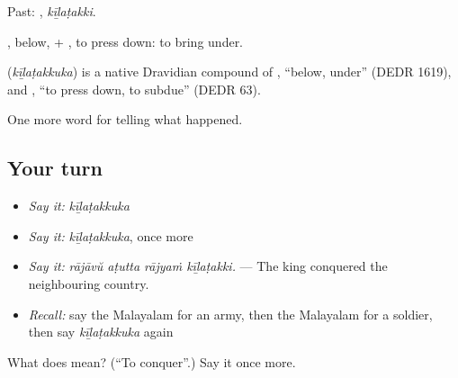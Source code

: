 Past: , \emph{kīḻaṭakki}.

, below, + , to press down: to bring under.

\begin{cousinweb}
\textbf{} (\emph{kīḻaṭakkuka}) is a native Dravidian compound of , \textquotedblleft{}below, under\textquotedblright{} (DEDR 1619), and , \textquotedblleft{}to press down, to subdue\textquotedblright{} (DEDR 63).
\end{cousinweb}

\begin{grammarlens}[title={What you've built}]
One more word for telling what happened.
\end{grammarlens}

\subsection*{Your turn}
\begin{itemize}
\raggedright
  \item \emph{Say it:} \emph{kīḻaṭakkuka}
  \item \emph{Say it:} \emph{kīḻaṭakkuka}, once more
  \item \emph{Say it:} \emph{rājāvŭ aṭutta rājyaṁ kīḻaṭakki.} — The king conquered the neighbouring country.
  \item \emph{Recall:} say the Malayalam for an army, then the Malayalam for a soldier, then say \emph{kīḻaṭakkuka} again
\end{itemize}

\begin{tcolorbox}[breakable,colback=teal!4,colframe=teal!35!black,title={Before you move on}]
What does  mean? (\textquotedblleft{}To conquer\textquotedblright{}.) Say it once more.
\end{tcolorbox}
